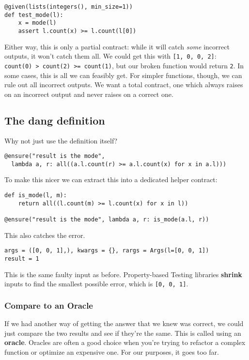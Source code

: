 \begin{verbatim}
@given(lists(integers(), min_size=1))
def test_mode(l):
    x = mode(l)
    assert l.count(x) >= l.count(l[0])
\end{verbatim}
Either way, this is only a partial contract: while it will catch
\emph{some} incorrect outputs, it won't catch them all. We could get
this with \texttt{{[}1,\ 0,\ 0,\ 2{]}}:
\texttt{count(0)\ \textgreater{}\ count(2)\ \textgreater{}=\ count(1)},
but our broken function would return \texttt{2}. In some cases, this is
all we can feasibly get. For simpler functions, though, we can rule out
all incorrect outputs. We want a total contract, one which always raises
on an incorrect output and never raises on a correct one.

\subsection{The dang definition}\label{the-dang-definition}

Why not just use the definition itself?

\begin{verbatim}
@ensure("result is the mode", 
  lambda a, r: all((a.l.count(r) >= a.l.count(x) for x in a.l)))
\end{verbatim}
To make this nicer we can extract this into a dedicated helper contract:

\begin{verbatim}
def is_mode(l, m):
    return all((l.count(m) >= l.count(x) for x in l))

@ensure("result is the mode", lambda a, r: is_mode(a.l, r))
\end{verbatim}
This also catches the error.

\begin{verbatim}
args = ([0, 0, 1],), kwargs = {}, rargs = Args(l=[0, 0, 1])
result = 1
\end{verbatim}
This is the same faulty input as before. Property-based Testing
libraries \textbf{shrink} inputs to find the smallest possible error,
which is \texttt{{[}0,\ 0,\ 1{]}}.

\subsubsection{Compare to an Oracle}\label{compare-to-an-oracle}

If we had another way of getting the answer that we knew was correct, we
could just compare the two results and see if they're the same. This is
called using an \textbf{oracle}. Oracles are often a good choice when
you're trying to refactor a complex function or optimize an expensive
one. For our purposes, it goes too far.

